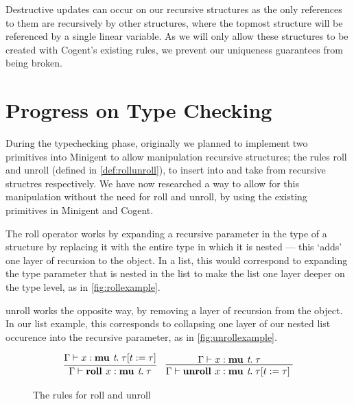 Destructive updates can occur on our recursive structures as the only references to them are
recursively by other structures, where the topmost structure will be referenced by a single linear
variable. As we will only allow these structures to be created with Cogent's existing rules,
we prevent our uniqueness guarantees from being broken.

\section{Progress on Type Checking}
\label{sec:typecheckingprogress}

During the typechecking phase, originally we planned to implement two primitives into Minigent to allow manipulation
recursive structures; the rules \textsf{roll} and \textsf{unroll} (defined in \autoref{def:rollunroll}),
to insert into and take from recursive structres respectively. We have now researched a way to allow
for this manipulation without the need for \textsf{roll} and \textsf{unroll}, by using the existing primitives
in Minigent and Cogent.

The \textsf{roll} operator works by expanding a recursive parameter 
in the type of a structure by replacing it with the entire type in which it is nested --- this `adds' one 
layer of recursion to the object. In a list, this would correspond to expanding the type parameter
that is nested in the list to make the list one layer deeper on the type level, as in \autoref{fig:rollexample}.

\textsf{unroll} works the opposite way, by removing a layer of recursion from the object. In our
list example, this corresponds to collapsing one layer of our nested list occurence into the
recursive parameter, as in \autoref{fig:unrollexample}. 

\begin{figure}
    \centering
    \begin{align*}
        \infer{
            \Gamma \vdash \textbf{roll } x : \textbf{mu } \textit{t}.\; \tau
        }{
            \Gamma \vdash x : \textbf{mu } \textit{t}.\; \tau[ t := \tau]
        }
        && \infer{
            \Gamma \vdash \textbf{unroll } x : \textbf{mu } \textit{t}.\; \tau[ t := \tau]\; 
        }{
            \Gamma \vdash x : \textbf{mu } \textit{t}.\; \tau
        }
    \end{align*}
    \caption{The rules for roll and unroll}
    \label{def:rollunroll}
\end{figure}

